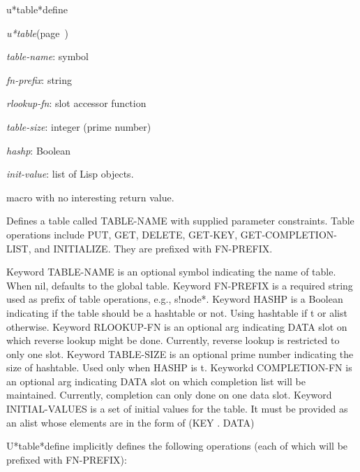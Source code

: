 \begin{description}
\item [Name:]  u*table*define

\item [Class:]
{\sl u*table}\hfill(page~\pageref{u*table})

\item [Parameters:]
\item {\sl table-name}:  symbol

\item {\sl fn-prefix}:  string

\item {\sl rlookup-fn}:  slot accessor function

\item {\sl table-size}:  integer (prime number)

\item {\sl hashp}:  Boolean 

\item {\sl init-value}:  list of Lisp objects.


\item [Return-value:] macro with no interesting return value.

\item [Description:]

Defines a table called TABLE-NAME with supplied parameter
constraints. Table operations include PUT, GET, DELETE,
GET-KEY, GET-COMPLETION-LIST, and INITIALIZE. They are prefixed with
FN-PREFIX.

Keyword TABLE-NAME is an optional symbol indicating the name of
table. When nil, defaults to the global table.  
Keyword FN-PREFIX is a required string used as prefix of table
operations, e.g., s!node*.
Keyword HASHP is a Boolean indicating if the table should be a
hashtable or not.  Using hashtable if t or alist otherwise.
Keyword RLOOKUP-FN is an optional arg indicating DATA slot on
which reverse lookup might be done. Currently, reverse lookup is
restricted to only one slot.
Keyword TABLE-SIZE is an optional prime number indicating the
size of hashtable. Used only when HASHP is t.
Keyworkd COMPLETION-FN is an optional arg indicating DATA slot on
which completion list will be maintained. Currently, completion can
only done on one data slot.
Keyword INITIAL-VALUES is a set of initial values for the table.
It must be provided as an alist whose elements are in the form
of (KEY . DATA)

U*table*define implicitly defines the following operations (each of
which will be prefixed with FN-PREFIX):


\end{description}
